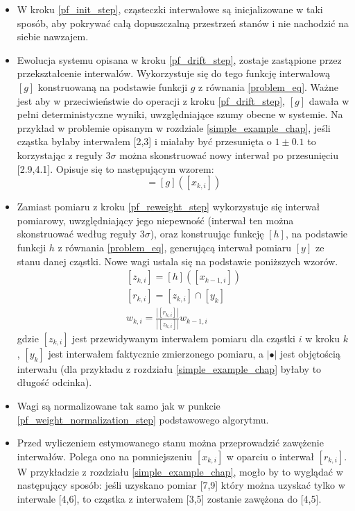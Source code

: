 \begin{itemize}
	\item W kroku \ref{pf_init_step}, cząsteczki interwałowe są inicjalizowane w taki sposób, aby pokrywać całą dopuszczalną przestrzeń stanów i nie nachodzić na siebie nawzajem.
	\item Ewolucja systemu opisana w kroku \ref{pf_drift_step}, zostaje zastąpione przez przekształcenie interwałów. Wykorzystuje się do tego funkcję interwałową $[g]$ konstruowaną na podstawie funkcji $g$ z równania \ref{problem_eq}. Ważne jest aby w przeciwieństwie do operacji z kroku \ref{pf_drift_step}, $[g]$ dawała w pełni deterministyczne wyniki, uwzględniające szumy obecne w systemie. Na przykład w problemie opisanym w rozdziale \ref{simple_example_chap}, jeśli cząstka byłaby interwałem [2,3] i miałaby być przesunięta o $1\pm 0.1$ to korzystając z reguły $3\sigma$ \cite{3_sigma_rule} można skonstruować nowy interwał po przesunięciu [2.9,4.1]. Opisuje się to następującym wzorem:
	\begin{equation}
		[x_{k+1,i}] = [g]([x_{k,i}])
	\end{equation}
	
	\item Zamiast pomiaru z kroku \ref{pf_reweight_step} wykorzystuje się interwał pomiarowy, uwzględniający jego niepewność (interwał ten można skonstruować według reguły $3\sigma$), oraz konstruując funkcję $[h]$, na podstawie funkcji $h$ z równania \ref{problem_eq}, generującą interwał pomiaru $[y]$ ze stanu danej cząstki. Nowe wagi ustala się na podstawie poniższych wzorów.
	\begin{equation}
		\begin{aligned}
			[z_{k,i}] = [h]([x_{k-1,i}])\\
			[r_{k,i}] = [z_{k,i}] \cap [y_{k}]\\
			w_{k,i} = \frac{|[r_{k,i}]|}{|[z_{k,i}]|} w_{k-1,i}
		\end{aligned}
	\end{equation}
	gdzie $[z_{k,i}]$ jest przewidywanym interwałem pomiaru dla cząstki $i$ w kroku $k$, $[y_{k}]$ jest interwałem faktycznie zmierzonego pomiaru, a $|\bullet|$ jest objętością interwału (dla przykładu z rozdziału \ref{simple_example_chap} byłaby to długość odcinka).
	\item Wagi są normalizowane tak samo jak w punkcie \ref{pf_weight_normalization_step} podstawowego algorytmu.
	
	\item Przed wyliczeniem estymowanego stanu można przeprowadzić zawężenie interwałów. Polega ono na pomniejszeniu $[x_{k,i}]$ w oparciu o interwał $[r_{k,i}]$. W przykładzie z rozdziału \ref{simple_example_chap}, mogło by to wyglądać w następujący sposób: jeśli uzyskano pomiar [7,9] który można uzyskać tylko w interwale [4,6], to cząstka z interwałem [3,5] zostanie zawężona do [4,5].
	

\end{itemize}
